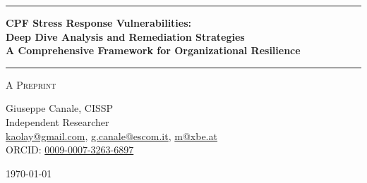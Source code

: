 \documentclass[11pt,a4paper]{article}
\begin{document}
\thispagestyle{empty}
\begin{center}

\vspace*{0.5cm}

\rule{\textwidth}{1.5pt}

\vspace{0.5cm}

{\LARGE \textbf{CPF Stress Response Vulnerabilities:}}\\[0.3cm]
{\LARGE \textbf{Deep Dive Analysis and Remediation Strategies}}\\[0.3cm]
{\LARGE \textbf{A Comprehensive Framework for Organizational Resilience}}

\vspace{0.5cm}

\rule{\textwidth}{1.5pt}

\vspace{0.3cm}

{\large \textsc{A Preprint}}

\vspace{0.5cm}

{\Large Giuseppe Canale, CISSP}\\[0.2cm]
Independent Researcher\\[0.1cm]
\href{mailto:kaolay@gmail.com}{kaolay@gmail.com}, 
\href{mailto:g.canale@escom.it}{g.canale@escom.it}, 
\href{mailto:m8xbe.at}{m@xbe.at}\\[0.1cm]
ORCID: \href{https://orcid.org/0009-0007-3263-6897}{0009-0007-3263-6897}

\vspace{0.8cm}

{\large \today}

\vspace{1cm}

\end{center}
\end{document}
